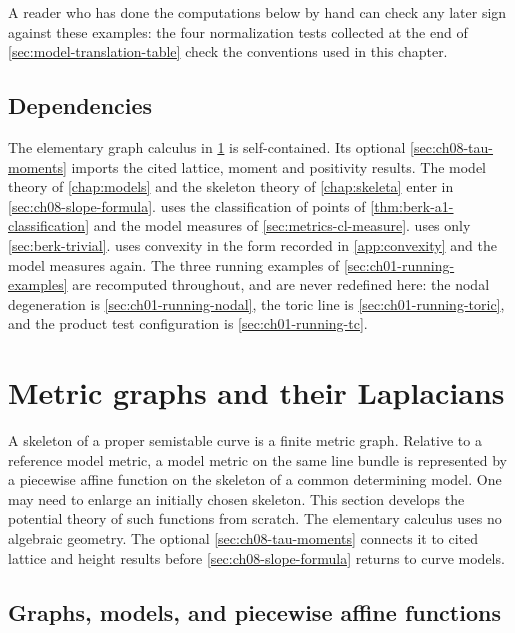 A reader who has done the computations below by hand can check any later sign
against these examples: the four normalization tests collected at the end of
\cref{sec:model-translation-table} check the conventions used in this chapter.

\subsection*{Dependencies}

The elementary graph calculus in \cref{sec:metric-graphs} is self-contained.
Its optional \cref{sec:ch08-tau-moments} imports the cited lattice,
moment and positivity results. The model theory of \cref{chap:models}
and the skeleton theory of \cref{chap:skeleta} enter in
\cref{sec:ch08-slope-formula}.  uses the
classification of points of \cref{thm:berk-a1-classification} and the model
measures of \cref{sec:metrics-cl-measure}.  
uses only \cref{sec:berk-trivial}.   uses convexity
in the form recorded in \cref{app:convexity} and the model measures again.
The three running examples of \cref{sec:ch01-running-examples} are recomputed
throughout, and are never redefined here: the nodal degeneration is
\cref{sec:ch01-running-nodal}, the toric line is
\cref{sec:ch01-running-toric}, and the product test configuration is
\cref{sec:ch01-running-tc}.

\section{Metric graphs and their Laplacians}
\label{sec:metric-graphs}

A skeleton of a proper semistable curve is a finite metric graph.  Relative
to a reference model metric, a model metric on the same line bundle is
represented by a piecewise affine function on the skeleton of a common
determining model.  One may need to enlarge an initially chosen skeleton.  This
section develops the potential theory of such functions from scratch.
The elementary calculus uses no algebraic geometry. The optional
\cref{sec:ch08-tau-moments} connects it to cited lattice and height
results before \cref{sec:ch08-slope-formula} returns to curve models.

\subsection{Graphs, models, and piecewise affine functions}
\label{sec:ch08-graph-basics}

